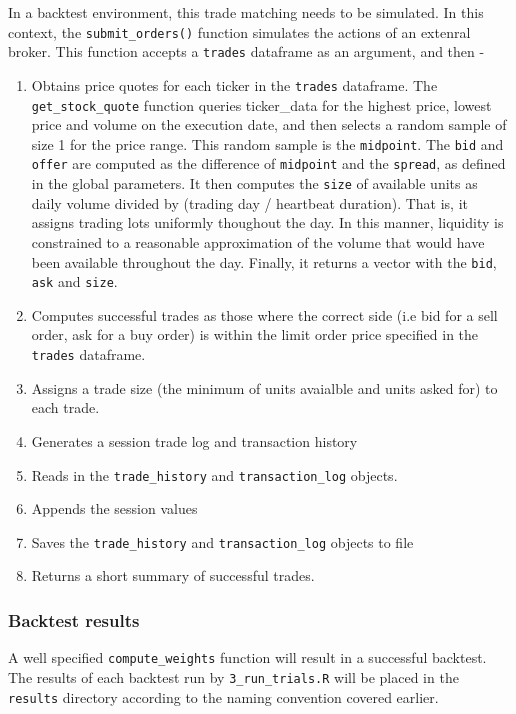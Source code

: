 \documentclass[11pt,preprint, authoryear]{elsarticle}
\numberwithin{equation}{section}
\numberwithin{figure}{section}
\numberwithin{table}{section}
\def\tightlist{} %
\begin{document}
In a backtest environment, this trade matching needs to be simulated. In
this context, the \texttt{submit\_orders()} function simulates the
actions of an extenral broker. This function accepts a \texttt{trades}
dataframe as an argument, and then -

\begin{enumerate}
\def\labelenumi{\arabic{enumi}.}
\tightlist
\item
  Obtains price quotes for each ticker in the \texttt{trades} dataframe.
  The \texttt{get\_stock\_quote} function queries ticker\_data for the
  highest price, lowest price and volume on the execution date, and then
  selects a random sample of size 1 for the price range. This random
  sample is the \texttt{midpoint}. The \texttt{bid} and \texttt{offer}
  are computed as the difference of \texttt{midpoint} and the
  \texttt{spread}, as defined in the global parameters. It then computes
  the \texttt{size} of available units as daily volume divided by
  (trading day / heartbeat duration). That is, it assigns trading lots
  uniformly thoughout the day. In this manner, liquidity is constrained
  to a reasonable approximation of the volume that would have been
  available throughout the day. Finally, it returns a vector with the
  \texttt{bid}, \texttt{ask} and \texttt{size}.
\item
  Computes successful trades as those where the correct side (i.e bid
  for a sell order, ask for a buy order) is within the limit order price
  specified in the \texttt{trades} dataframe.
\item
  Assigns a trade size (the minimum of units avaialble and units asked
  for) to each trade.
\item
  Generates a session trade log and transaction history
\item
  Reads in the \texttt{trade\_history} and \texttt{transaction\_log}
  objects.
\item
  Appends the session values
\item
  Saves the \texttt{trade\_history} and \texttt{transaction\_log}
  objects to file
\item
  Returns a short summary of successful trades.
\end{enumerate}

\subsubsection{Backtest results}\label{backtest-results}

A well specified \texttt{compute\_weights} function will result in a
successful backtest. The results of each backtest run by
\texttt{3\_run\_trials.R} will be placed in the \texttt{results}
directory according to the naming convention covered earlier.
\end{document}
